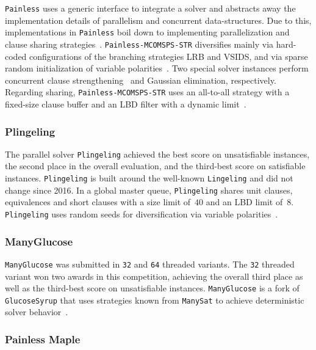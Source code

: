 \documentclass{elsarticle}
\newcommand{\solver}[1]{\texttt{#1}}
\begin{document}
\solver{Painless} uses a generic interface to integrate a solver and abstracts away the implementation details of parallelism and concurrent data-structures. Due to this,  implementations in \solver{Painless} boil down to implementing parallelization and clause sharing strategies~\cite{Frioux:2017:Painless}. 
\solver{Painless-MCOMSPS-STR} diversifies mainly via hard-coded configurations of the branching strategies LRB and VSIDS, and via sparse random initialization of variable polarities~\cite{Balyo:2015:HordeSATs}. 
Two special solver instances perform concurrent clause strengthening~\cite{Wieringa:2013:CCS} and Gaussian elimination, respectively. 
Regarding sharing, \solver{Painless-MCOMSPS-STR} uses an all-to-all strategy with a fixed-size clause buffer and an LBD filter with a dynamic limit~\cite{SC2020}. 


\subsubsection{Plingeling} 

The parallel solver 
\solver{Plingeling} achieved the best score on unsatisfiable instances, the second place in the overall evaluation, and the third-best score on satisfiable instances. 
\solver{Plingeling} is built around the well-known \solver{Lingeling} and did not change since 2016. 
In a global master queue, \solver{Plingeling} shares unit clauses, equivalences and short clauses with a size limit of~$40$ and an LBD limit of~$8$. 
\solver{Plingeling} uses random seeds for diversification via variable polarities~\cite{Biere:SC2020,Biere:2012:Lingeling}. 


\subsubsection{ManyGlucose}

\solver{ManyGlucose} was submitted in \solver{32} and \solver{64} threaded variants. 
The \solver{32} threaded variant won two awards in this competition, achieving the overall third place as well as the third-best score on unsatisfiable instances. 
\solver{ManyGlucose} is a fork of \solver{GlucoseSyrup} that uses strategies known from \solver{ManySat} to achieve deterministic solver behavior~\cite{Audemard:2018:GlucoseSyrup,Audemard:2014:LazyClauseExchange,Hamadi:2009:ManySat}. 


\subsubsection{Painless Maple} 
\end{document}
